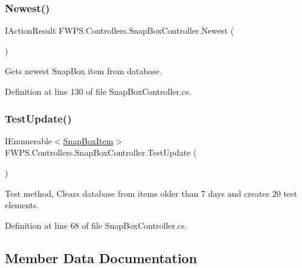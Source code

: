 \subsubsection{\texorpdfstring{Newest()}{Newest()}}
{\footnotesize\ttfamily I\+Action\+Result F\+W\+P\+S.\+Controllers.\+Snap\+Box\+Controller.\+Newest (\begin{DoxyParamCaption}{ }\end{DoxyParamCaption})}



Gets newest Snap\+Box item from database. 



Definition at line 130 of file Snap\+Box\+Controller.\+cs.

\mbox{\label{class_f_w_p_s_1_1_controllers_1_1_snap_box_controller_a5bd420e6ce51fda0bf43aed631045be7}} 
\subsubsection{\texorpdfstring{Test\+Update()}{TestUpdate()}}
{\footnotesize\ttfamily I\+Enumerable$<$\mbox{\hyperlink{class_f_w_p_s_1_1_models_1_1_snap_box_item}{Snap\+Box\+Item}}$>$ F\+W\+P\+S.\+Controllers.\+Snap\+Box\+Controller.\+Test\+Update (\begin{DoxyParamCaption}{ }\end{DoxyParamCaption})}



Test method, Clears database from items older than 7 days and creates 20 test elements. 



Definition at line 68 of file Snap\+Box\+Controller.\+cs.



\subsection{Member Data Documentation}
\mbox{\label{class_f_w_p_s_1_1_controllers_1_1_snap_box_controller_aeaf63b1f6165ca718c06f7ff8861cdcb}} 
